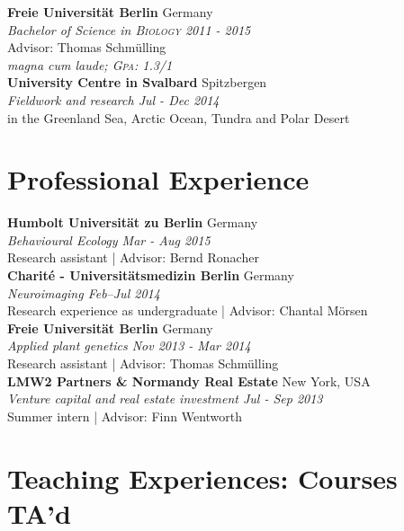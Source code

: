 \documentclass[a4paper,11pt]{article} %
\begin{document}
\textbf{Freie Universität Berlin} \hfill Germany\\
\textit{Bachelor of Science in \textsc{Biology} \hfill 2011 - 2015}\\
\small Advisor: Thomas Schmülling\\
\textit{magna cum laude; \textsc{Gpa}: 1.3/1} \normalsize \\

\textbf{University Centre in Svalbard} \hfill Spitzbergen \\ 
\textit{Fieldwork and research \hfill Jul - Dec 2014} \\
\small{in the Greenland Sea, Arctic Ocean, Tundra and Polar Desert}\normalsize \\

\section{Professional Experience}


\textbf{Humbolt Universität zu Berlin} \hfill Germany\\
\textit{Behavioural Ecology \hfill Mar - Aug 2015}\\
\small{Research assistant | Advisor: Bernd Ronacher}\normalsize  \\ 

\textbf{Charité - Universitätsmedizin Berlin} \hfill Germany\\
\textit{Neuroimaging \hfill Feb--Jul 2014} \\
\small{Research experience as undergraduate | Advisor: Chantal Mörsen}\normalsize \\ 


\textbf{Freie Universität Berlin} \hfill Germany\\
\textit{Applied plant genetics \hfill Nov 2013 - Mar 2014} \\
\small{Research assistant | Advisor: Thomas Schmülling}\normalsize  \\ 

\textbf{LMW2 Partners \& Normandy Real Estate} \hfill New York, USA\\
\textit{Venture capital and real estate investment \hfill Jul - Sep 2013} \\
\small{Summer intern | Advisor: Finn Wentworth}\normalsize \\ 


\section{Teaching Experiences: Courses TA'd}
\end{document}
